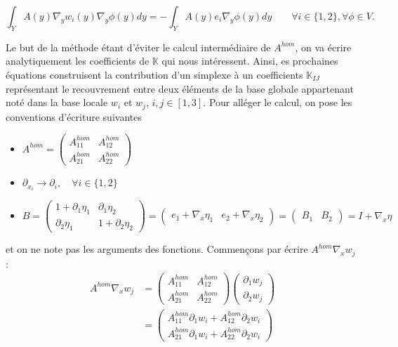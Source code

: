 \documentclass[11pt]{article}
\newcommand{\K}{\mathbb{K}}
\newcommand{\Ah}{A^{hom}}
\begin{document}
\begin{equation}
  \int_{Y} A(y)\nabla_y w_i(y) \nabla_y \phi(y) dy =
  - \int_{Y} A(y) e_i \nabla_y \phi(y) dy \qquad \forall i \in \{1, 2\}, \forall \phi\in V.
\end{equation}

Le but de la méthode étant d'éviter le calcul intermédiaire de $\Ah$, on va écrire analytiquement les coefficients de $\K$ qui nous
intéressent. Ainsi, es prochaines équations construisent la contribution d'un simplexe à un coefficients $\K_{IJ}$ représentant le recouvrement entre
deux éléments de la base globale appartenant noté dans la base locale $w_i$ et $w_j$, $i,j\in [1,3]$. Pour alléger le calcul, on pose les conventions
d'écriture suivantes
\begin{itemize}
\item
  $ 
  \Ah = \left(
    \begin{matrix}
      \Ah_{11} & \Ah_{12} \\
      \Ah_{21} & \Ah_{22}
    \end{matrix}
  \right)
  $
\item $ \partial_{x_i} \rightarrow \partial_i, \quad \forall i \in\{1,2\}$  
\item 
  $
  B = \left(
    \begin{matrix}
      1+\partial_1 \eta_1 &   \partial_1 \eta_2 \\
        \partial_2 \eta_1 & 1+\partial_2 \eta_2
    \end{matrix}
  \right)
  = \left(
    \begin{matrix}
      e_1 + \nabla_x \eta_1 & e_2 + \nabla_x \eta_2
    \end{matrix}
  \right)
  = \left(
    \begin{matrix}
      B_1 & B_2
    \end{matrix}
  \right)
  = I + \nabla_x \eta
  $
\end{itemize}
et on ne note pas les arguments des fonctions. Commençons par écrire $\Ah\nabla_x w_j$ :
\begin{equation}
  \begin{aligned}
    \Ah\nabla_x w_j &=
    \left(
      \begin{matrix}
        \Ah_{11} & \Ah_{12} \\
        \Ah_{21} & \Ah_{22}
      \end{matrix}
    \right)
    \left(
      \begin{matrix}
        \partial_1 w_j \\
        \partial_2 w_j
      \end{matrix}
    \right) \\
    &=
    \left(
      \begin{matrix}
        \Ah_{11} \partial_1 w_i + \Ah_{12} \partial_2 w_i \\
        \Ah_{21} \partial_1 w_i + \Ah_{22} \partial_2 w_i 
      \end{matrix}
    \right)
  \end{aligned}
\end{equation}
\end{document}
